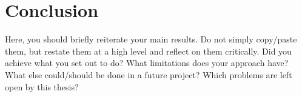 \chapter{Conclusion}

Here, you should briefly reiterate your main results.
Do not simply copy/paste them, but restate them at a high level and reflect on them critically.
Did you achieve what you set out to do?
What limitations does your approach have?
What else could/should be done in a future project?
Which problems are left open by this thesis?
